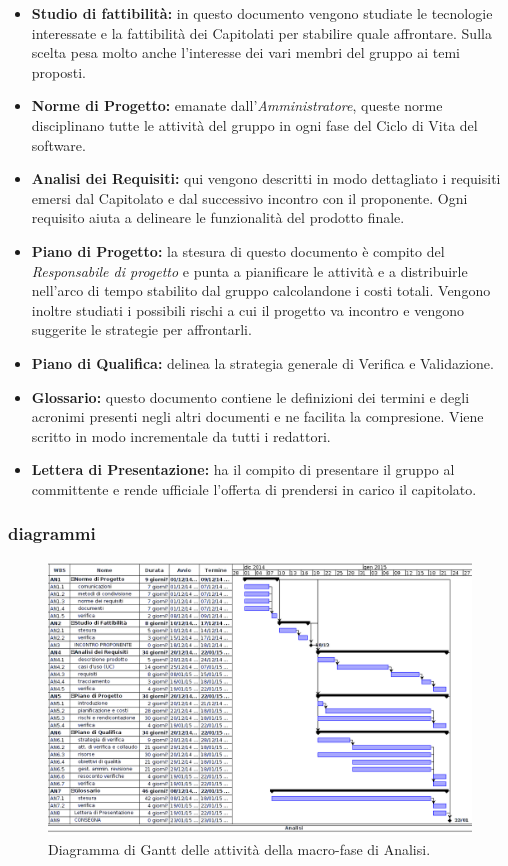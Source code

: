 \begin{itemize}
\item \textbf{Studio di fattibilità:} in questo documento vengono studiate le tecnologie interessate e la fattibilità dei Capitolati per stabilire quale affrontare. Sulla scelta pesa molto anche l'interesse dei vari membri del gruppo ai temi proposti.
\item \textbf{Norme di Progetto:} emanate dall'\textit{Amministratore}, queste norme disciplinano tutte le attività del gruppo in ogni fase del Ciclo di Vita del software.
\item \textbf{Analisi dei Requisiti:} qui vengono descritti in modo dettagliato i requisiti emersi dal Capitolato e dal successivo incontro con il proponente. Ogni requisito aiuta a delineare le funzionalità del prodotto finale.
\item \textbf{Piano di Progetto:} la stesura di questo documento è compito del \textit{Responsabile di progetto} e punta a pianificare le attività e a distribuirle nell'arco di tempo stabilito dal gruppo calcolandone i costi totali. Vengono inoltre studiati i possibili rischi a cui il progetto va incontro e vengono suggerite le strategie per affrontarli.
\item \textbf{Piano di Qualifica:} delinea la strategia generale di Verifica e Validazione.
\item \textbf{Glossario:} questo documento contiene le definizioni dei termini e degli acronimi presenti negli altri documenti e ne facilita la compresione. Viene scritto in modo incrementale da tutti i redattori.
\item \textbf{Lettera di Presentazione:} ha il compito di presentare il gruppo al committente e rende ufficiale l'offerta di prendersi in carico il capitolato.
\end{itemize}

\newpage
\subsubsection{diagrammi}

\begin{figure}[h]
\begin{center}
\includegraphics[width=\textwidth, height=\textheight, keepaspectratio]{img/analisi-gantt.png}
\caption{Diagramma di Gantt delle attività della macro-fase di Analisi.}
\end{center}
\end{figure}
\clearpage

